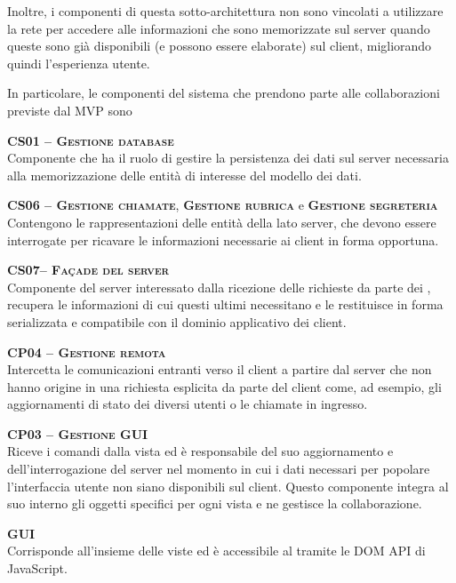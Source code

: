 Inoltre, i componenti di questa sotto-architettura non sono vincolati a utilizzare la rete per accedere alle informazioni che sono memorizzate sul server quando queste sono già disponibili (e possono essere elaborate) sul client, migliorando quindi l'esperienza utente.

In particolare, le componenti del sistema che prendono parte alle collaborazioni previste dal  MVP sono
\begin{description}
  \item{\scshape\bfseries CS01 -- Gestione database}\\
Componente che ha il ruolo di gestire la persistenza dei dati sul server necessaria alla memorizzazione delle entità di interesse del modello dei dati.

  \item{\textsc{\bfseries CS06 -- Gestione chiamate}, \textsc{\bfseries Gestione rubrica} e \textsc{\bfseries Gestione segreteria}}\\
Contengono le rappresentazioni delle entità della  lato server, che devono essere interrogate per ricavare le informazioni necessarie ai client in forma opportuna.

  \item{\scshape\bfseries CS07-- Façade del server}\\
Componente del server interessato dalla ricezione delle richieste da parte dei , recupera le informazioni di cui questi ultimi necessitano e le restituisce in forma serializzata e compatibile con il dominio applicativo dei client.

  \item{\scshape\bfseries CP04 -- Gestione remota}\\
Intercetta le comunicazioni entranti verso il client a partire dal server che non hanno origine in una richiesta esplicita da parte del client come, ad esempio, gli aggiornamenti di stato dei diversi utenti o le chiamate in ingresso.
  
  \item{\scshape\bfseries CP03 -- Gestione GUI}\\
Riceve i comandi dalla vista ed è responsabile del suo aggiornamento e dell'interrogazione del server nel momento in cui i dati necessari per popolare l'interfaccia utente non siano disponibili sul client. Questo componente integra al suo interno gli oggetti  specifici per ogni vista e ne gestisce la collaborazione.

  \item{\scshape\bfseries GUI}\\
Corrisponde all'insieme delle viste ed è accessibile al  tramite le DOM API di JavaScript.
\end{description}

